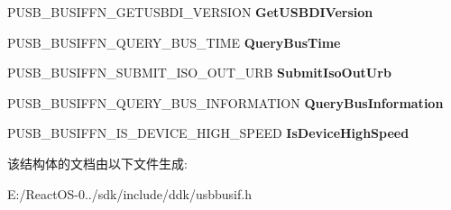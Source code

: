 \begin{DoxyCompactItemize}
P\+U\+S\+B\+\_\+\+B\+U\+S\+I\+F\+F\+N\+\_\+\+G\+E\+T\+U\+S\+B\+D\+I\+\_\+\+V\+E\+R\+S\+I\+ON {\bfseries Get\+U\+S\+B\+D\+I\+Version}
\item 
\mbox{\label{struct___u_s_b___b_u_s___i_n_t_e_r_f_a_c_e___u_s_b_d_i___v1_af337ef7d149414a54dd2cf1e4204f548}} 
P\+U\+S\+B\+\_\+\+B\+U\+S\+I\+F\+F\+N\+\_\+\+Q\+U\+E\+R\+Y\+\_\+\+B\+U\+S\+\_\+\+T\+I\+ME {\bfseries Query\+Bus\+Time}
\item 
\mbox{\label{struct___u_s_b___b_u_s___i_n_t_e_r_f_a_c_e___u_s_b_d_i___v1_a102d0bdd2501928917ab26fd7939777f}} 
P\+U\+S\+B\+\_\+\+B\+U\+S\+I\+F\+F\+N\+\_\+\+S\+U\+B\+M\+I\+T\+\_\+\+I\+S\+O\+\_\+\+O\+U\+T\+\_\+\+U\+RB {\bfseries Submit\+Iso\+Out\+Urb}
\item 
\mbox{\label{struct___u_s_b___b_u_s___i_n_t_e_r_f_a_c_e___u_s_b_d_i___v1_a581587068c7846279dc62ea757fdf6da}} 
P\+U\+S\+B\+\_\+\+B\+U\+S\+I\+F\+F\+N\+\_\+\+Q\+U\+E\+R\+Y\+\_\+\+B\+U\+S\+\_\+\+I\+N\+F\+O\+R\+M\+A\+T\+I\+ON {\bfseries Query\+Bus\+Information}
\item 
\mbox{\label{struct___u_s_b___b_u_s___i_n_t_e_r_f_a_c_e___u_s_b_d_i___v1_a93b3fe77bab01e981ed3095a3bb4767b}} 
P\+U\+S\+B\+\_\+\+B\+U\+S\+I\+F\+F\+N\+\_\+\+I\+S\+\_\+\+D\+E\+V\+I\+C\+E\+\_\+\+H\+I\+G\+H\+\_\+\+S\+P\+E\+ED {\bfseries Is\+Device\+High\+Speed}
\end{DoxyCompactItemize}


该结构体的文档由以下文件生成\+:\begin{DoxyCompactItemize}
\item 
E\+:/\+React\+O\+S-\/0../sdk/include/ddk/usbbusif.\+h\end{DoxyCompactItemize}
